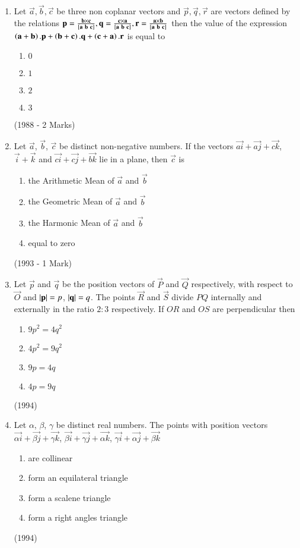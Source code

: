 \documentclass[journal]{IEEEtran}
\begin{document}
\begin{enumerate}
\item Let $\vec{a}, \vec{b}, \vec{c}$ be three non coplanar vectors and $\vec{p}, \vec{q},\vec{r}$ are vectors defined by the relations $\vec{p}=\frac{\vec{b}\times\vec{c}}{\sbrak{\vec{a}\ \vec{b}\ \vec{c}}}, \vec{q}=\frac{\vec{c}\times\vec{a}}{\sbrak{\vec{a}\ \vec{b}\ \vec{c}}},\vec{r}=\frac{\vec{a}\times\vec{b}}{\sbrak{\vec{a}\ \vec{b}\ \vec{c}}}$ then the value of the expression $\left(\mathbf{a}+\mathbf{b}\right).\mathbf{p}+\left(\mathbf{b}+\mathbf{c}\right).\mathbf{q}+\left(\mathbf{c}+\mathbf{a}\right).\mathbf{r}$ is equal to
\begin{enumerate}
\item $0$
\item $1$
\item $2$
\item $3$
\end{enumerate}
\hfill (1988 - 2 Marks)

\item Let $\vec{a}$, $\vec{b}$, $\vec{c}$ be distinct non-negative numbers. If the vectors $\vec{ai} + \vec{aj} + \vec{ck}$, $\vec{i}+\vec{k}$ and $\vec{ci}+\vec{cj}+\vec{bk}$ lie in a plane, then $\vec{c}$ is
\begin{enumerate}
\item the Arithmetic Mean of $\vec{a}$ and $\vec{b}$
\item the Geometric Mean of $\vec{a}$ and $\vec{b}$
\item the Harmonic Mean of $\vec{a}$ and $\vec{b}$
\item equal to zero
\end{enumerate}
\hfill (1993 - 1 Mark)

\item Let $\vec{p}$ and $\vec{q}$ be the position vectors of $\vec{P}$ and $\vec{Q}$ respectively, with respect to $\vec{O}$ and $\left\vert\mathbf{p}\right\vert = p$, $\left\vert\mathbf{q}\right\vert = q$. The points $\vec{R}$ and $\vec{S}$ divide $PQ$ internally and externally in the ratio $2\colon3$ respectively. If $OR$ and $OS$ are perpendicular then
\begin{enumerate}
\item $9p^2 =4q^2$
\item $4p^2 = 9q^2$
\item $9p = 4q$
\item $4p = 9q$
\end{enumerate}
\hfill (1994)

\item Let $\alpha$, $\beta$, $\gamma$ be distinct real numbers. The points with position vectors $\vec{\alpha i}+ \vec{\beta j} + \vec{\gamma k}$, $\vec{\beta i}+ \vec{\gamma j}+ \vec{\alpha k}$, $\vec{\gamma i} + \vec{\alpha j} + \vec{\beta k}$
\begin{enumerate}
\item are collinear
\item form an equilateral triangle
\item form a scalene triangle
\item form a right angles triangle
\end{enumerate}
\hfill (1994)


\end{enumerate}
\end{document}
